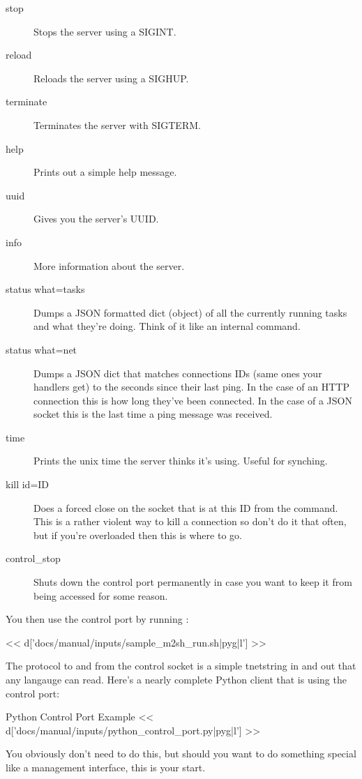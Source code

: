 \begin{description}
\item[stop] Stops the server using a SIGINT.
\item[reload] Reloads the server using a SIGHUP.
\item[terminate] Terminates the server with SIGTERM.
\item[help] Prints out a simple help message.
\item[uuid] Gives you the server's UUID.
\item[info] More information about the server.
\item[status what=tasks] Dumps a JSON formatted dict (object) of all the currently
    running tasks and what they're doing.  Think of it like an internal 
    command.
\item[status what=net] Dumps a JSON dict that matches connections IDs (same ones your
        handlers get) to the seconds since their last ping.  In the case of an
        HTTP connection this is how long they've been connected.  In the case
        of a JSON socket this is the last time a ping message was received.
\item[time] Prints the unix time the server thinks it's using.  Useful for synching.
\item[kill id=ID] Does a forced close on the socket that is at this ID from the 
    command.  This is a rather violent way to kill a connection so don't do it that
    often, but if you're overloaded then this is where to go.
\item[control\_stop] Shuts down the control port permanently in case you want to keep
    it from being accessed for some reason.
\end{description}

You then use the control port by running :

<< d['docs/manual/inputs/sample_m2sh_run.sh|pyg|l'] >>

The protocol to and from the control socket is a simple tnetstring in and out that
any langauge can read.  Here's a nearly complete Python client that is using
the control port:

\begin{code}{Python Control Port Example}
<< d['docs/manual/inputs/python_control_port.py|pyg|l'] >>
\end{code}

You obviously don't need to do this, but should you want to do
something special like a management interface, this is your start.


